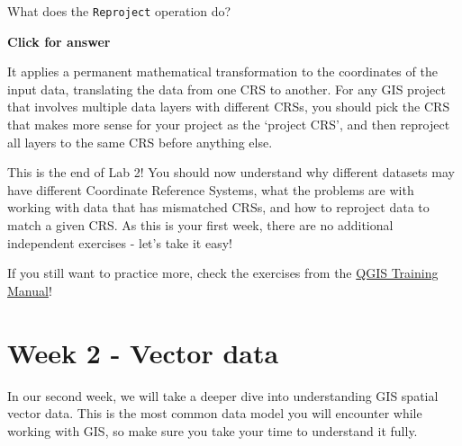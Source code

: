 \documentclass[
  letterpaper,
  DIV=11,
  numbers=noendperiod]{scrreprt}
\begin{document}
\begin{tcolorbox}[enhanced jigsaw, coltitle=black, toprule=.15mm, breakable, opacitybacktitle=0.6, left=2mm, colback=white, leftrule=.75mm, rightrule=.15mm, colbacktitle=quarto-callout-important-color!10!white, toptitle=1mm, titlerule=0mm, colframe=quarto-callout-important-color-frame, arc=.35mm, bottomtitle=1mm, opacityback=0, bottomrule=.15mm, title=\textcolor{quarto-callout-important-color}{\faExclamation}\hspace{0.5em}{Stop and Think}]

What does the \texttt{Reproject} operation do?

\end{tcolorbox}

\begin{tcolorbox}[enhanced jigsaw, toprule=.15mm, breakable, left=2mm, colframe=quarto-callout-important-color-frame, colback=white, arc=.35mm, leftrule=.75mm, opacityback=0, rightrule=.15mm, bottomrule=.15mm]

\vspace{-3mm}\textbf{Click for answer}\vspace{3mm}

It applies a permanent mathematical transformation to the coordinates of
the input data, translating the data from one CRS to another. For any
GIS project that involves multiple data layers with different CRSs, you
should pick the CRS that makes more sense for your project as the
`project CRS', and then reproject all layers to the same CRS before
anything else.

\end{tcolorbox}

This is the end of Lab 2! You should now understand why different
datasets may have different Coordinate Reference Systems, what the
problems are with working with data that has mismatched CRSs, and how to
reproject data to match a given CRS. As this is your first week, there
are no additional independent exercises - let's take it easy!

If you still want to practice more, check the exercises from the
\href{https://docs.qgis.org/3.34/en/docs/training_manual/basic_map/index.html}{QGIS
Training Manual}!

\part{Week 2 - Vector data}

In our second week, we will take a deeper dive into understanding GIS
spatial vector data. This is the most common data model you will
encounter while working with GIS, so make sure you take your time to
understand it fully.
\end{document}
